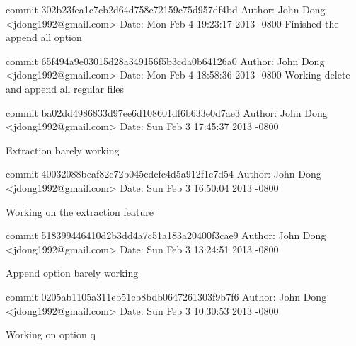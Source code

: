\documentclass[letterpaper,10pt,titlepage]{article}
\begin{document}
commit 302b23fea1c7cb2d64d758e72159c75d957df4bd\newline
Author: John Dong <jdong1992@gmail.com>\newline
Date:   Mon Feb 4 19:23:17 2013 -0800\newline
\newline
    Finished the append all option\newline

commit 65f494a9e03015d28a349156f5b3cda0b64126a0\newline
Author: John Dong <jdong1992@gmail.com>\newline
Date:   Mon Feb 4 18:58:36 2013 -0800\newline
\newline
    Working delete and append all regular files\newline

commit ba02dd4986833d97ee6d108601df6b633e0d7ae3\newline
Author: John Dong <jdong1992@gmail.com>\newline
Date:   Sun Feb 3 17:45:37 2013 -0800\newline

    Extraction barely working\newline

commit 40032088bcaf82c72b045cdcfc4d5a912f1c7d54\newline
Author: John Dong <jdong1992@gmail.com>\newline
Date:   Sun Feb 3 16:50:04 2013 -0800\newline

    Working on the extraction feature\newline

commit 518399446410d2b3dd4a7c51a183a20400f3cae9\newline
Author: John Dong <jdong1992@gmail.com>\newline
Date:   Sun Feb 3 13:24:51 2013 -0800\newline

    Append option barely working\newline

commit 0205ab1105a311eb51cb8bdb0647261303f9b7f6\newline
Author: John Dong <jdong1992@gmail.com>\newline
Date:   Sun Feb 3 10:30:53 2013 -0800\newline

    Working on option q\newline
\end{document}
